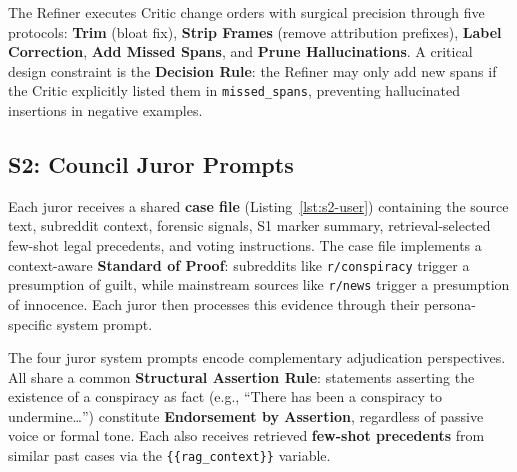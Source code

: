 \documentclass[11pt]{article}
\begin{document}
The Refiner executes Critic change orders with surgical precision through five
protocols: \textbf{Trim} (bloat fix), \textbf{Strip Frames} (remove attribution
prefixes), \textbf{Label Correction}, \textbf{Add Missed Spans}, and
\textbf{Prune Hallucinations}. A critical design constraint is the
\textbf{Decision Rule}: the Refiner may only add new spans if the Critic
explicitly listed them in \texttt{missed\_spans}, preventing hallucinated
insertions in negative examples.





\subsection{S2: Council Juror Prompts}
\label{sec:prompt-council}

Each juror receives a shared \textbf{case file} (Listing~\ref{lst:s2-user})
containing the source text, subreddit context, forensic signals, S1 marker
summary, retrieval-selected few-shot legal precedents, and voting instructions.
The case file implements a context-aware \textbf{Standard of Proof}: subreddits
like \texttt{r/conspiracy} trigger a presumption of guilt, while mainstream
sources like \texttt{r/news} trigger a presumption of innocence. Each juror
then processes this evidence through their persona-specific system prompt.



The four juror system prompts encode complementary adjudication perspectives.
All share a common \textbf{Structural Assertion Rule}: statements asserting the
existence of a conspiracy as fact (e.g., ``There has been a conspiracy to
undermine\ldots'') constitute \textbf{Endorsement by Assertion}, regardless of
passive voice or formal tone. Each also receives retrieved \textbf{few-shot
	precedents} from similar past cases via the \texttt{\{\{rag\_context\}\}}
variable.




\end{document}
